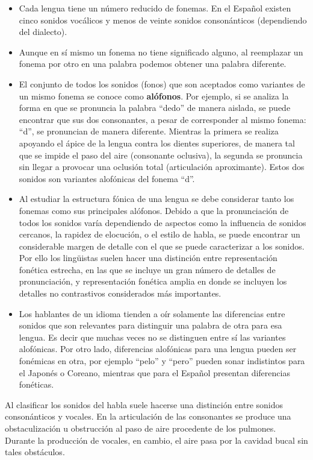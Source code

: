 \begin{itemize}
\item Cada lengua tiene un número reducido de fonemas. En el Español existen cinco sonidos vocálicos y menos de veinte sonidos consonánticos (dependiendo del dialecto).
\item Aunque en sí mismo un fonema no tiene significado alguno, al reemplazar un fonema por otro en una palabra podemos obtener una palabra diferente.
\item El conjunto de todos los sonidos (fonos) que son aceptados como variantes de un mismo fonema se conoce como \textbf{alófonos}. Por ejemplo, si se analiza la forma en que se pronuncia la palabra “dedo” de manera aislada, se puede encontrar que sus dos consonantes, a pesar de corresponder al mismo fonema: “d”, se
pronuncian de manera diferente. Mientras la primera se realiza apoyando el ápice de la lengua contra los dientes superiores, de manera tal que se impide el paso del aire (consonante oclusiva), la segunda se pronuncia sin llegar a provocar una oclusión total (articulación aproximante). Estos dos sonidos son variantes
alofónicas del fonema “d”.
\item Al estudiar la estructura fónica de una lengua se debe considerar tanto los fonemas como sus principales alófonos. Debido a que la pronunciación de todos los sonidos varía dependiendo de aspectos como la influencia de sonidos cercanos, la rapidez de elocución, o el estilo de habla, se puede encontrar un considerable margen de detalle con el que se puede caracterizar a los
sonidos. Por ello los lingüistas suelen hacer una distinción entre representación fonética estrecha, en las que se incluye un gran número de detalles de pronunciación, y representación fonética amplia en donde se incluyen los detalles no contrastivos considerados más importantes.
\item Los hablantes de un idioma tienden a oír solamente las diferencias entre sonidos que son relevantes para distinguir una palabra de otra para esa lengua. Es decir que muchas veces no se distinguen entre sí las variantes alofónicas. Por otro lado, diferencias alofónicas para una lengua pueden ser fonémicas en otra, por ejemplo “pelo” y “pero” pueden sonar indistintos para el Japonés
o Coreano, mientras que para el Español presentan diferencias fonéticas.
\end{itemize}
Al clasificar los sonidos del habla suele hacerse una distinción entre sonidos consonánticos y vocales. En la articulación de las consonantes se produce una obstaculización u obstrucción al paso de aire procedente de los pulmones. Durante la producción de vocales, en cambio, el aire pasa por la cavidad bucal sin tales
obstáculos.

